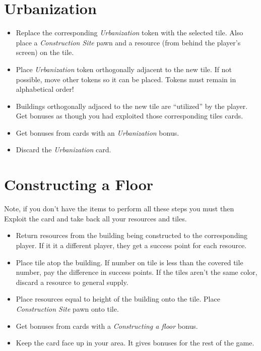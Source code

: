 \documentclass[10pt]{article}
\newenvironment{itemizeCustom}
{\begin{itemize}
  \setlength{\itemsep}{1pt}
  \setlength{\parskip}{0pt}
  \setlength{\parsep}{0pt}}
{\end{itemize}}
\begin{document}
\begin{mdframed}[style = customFrame]
\begin{multicols*}{2}
\section*{Urbanization}
\begin{itemizeCustom}
	\item Replace the corresponding \emph{Urbanization} token with the selected tile. Also place a \emph{Construction Site} pawn and a resource (from behind the player's screen) on the tile.
	\item Place \emph{Urbanization} token orthogonally adjacent to the new tile. If not possible, move other tokens so it can be placed. Tokens must remain in alphabetical order!
	\item Buildings orthogonally adjaced to the new tile are ``utilized'' by the player. Get bonuses as though you had exploited those corresponding tiles cards.
	\item Get bonuses from cards with an \emph{Urbanization} bonus.
	\item Discard the \emph{Urbanization} card.
\end{itemizeCustom}

\section*{Constructing a Floor}
Note, if you don't have the items to perform all these steps you must then Exploit the card and take back all your resources and tiles.
\begin{itemizeCustom}
	\item Return resources from the building being constructed to the corresponding player. If it it a different player, they get a success point for each resource.
	\item Place tile atop the building. If number on tile is less than the covered tile number, pay the difference in success points. If the tiles aren't the same color, discard a resource to general supply.
	\item Place resources equal to height of the building onto the tile. Place \emph{Construction Site} pawn onto tile.
	\item Get bonuses from cards with a \emph{Constructing a floor} bonus.
	\item Keep the card face up in your area. It gives bonuses for the rest of the game.
\end{itemizeCustom}


\end{multicols*}
\end{mdframed}
\end{document}
